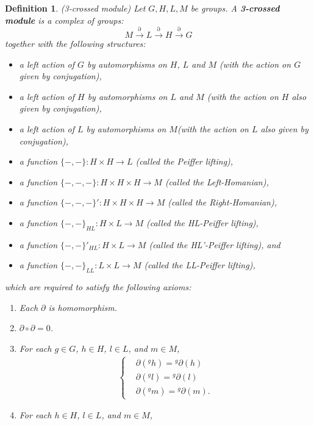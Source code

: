 \documentclass{tac}
\newtheorem{dfn}{Definition}
\begin{document}
\begin{dfn}{(3-crossed module)}
\label{d3cm}
Let $G,H,L,M$ be groups. A {\bf 3-crossed module} is a complex of groups:
\[
 M\xrightarrow{\partial}L \xrightarrow{\partial} H \xrightarrow{\partial} G 
\]
together with the following structures:
\begin{itemize}
  \item a left action of $G$ by automorphisms on  $H$, $L$ and $M$ (with the action on $G$ given by conjugation),
  \item a left action of $H$ by automorphisms on $L$ and $M$ (with the action on $H$ also given by conjugation),
  \item a left action of $L$ by automorphisms on $M$(with the action on $L$ also given by conjugation),
  \item a function $\{-,-\} : H \times H \rightarrow L$ (called the Peiffer lifting),
  \item a function $\{-,-,-\} : H \times H \times H  \rightarrow M$ (called the Left-Homanian),
  \item a function $\{-,-,-\}' : H \times H \times H  \rightarrow M$ (called the Right-Homanian),
  \item a function $\{-,-\}_{HL} : H \times L \rightarrow M$ (called the HL-Peiffer lifting),
  \item a function $\{-,-\}'_{HL} : H \times L \rightarrow M$ (called the HL'-Peiffer lifting),  and
  \item a function $\{-,-\}_{LL} : L \times L \rightarrow M$ (called the LL-Peiffer lifting),         
\end{itemize}
which are required to satisfy the following axioms:
\begin{enumerate}
  \item Each $\partial$ is homomorphism.
  \item  $\partial\circ \partial =0$.
  \item For each $g \in G$, $h \in H$, $l \in L$, and $m \in M$,
  \begin{align*}
\left\{
    \begin{aligned}
    & \partial({}^gh)= {{}^g}\partial(h) \\
    & \partial({}^gl)= {{}^g}\partial(l)  \\
    & \partial({}^gm)= {{}^g}\partial(m) .
    \end{aligned}
\right.
\end{align*}
  \item For each $h \in H$, $l \in L$, and $m \in M$,
  \begin{align*}

\end{align*}
\end{enumerate}
\end{dfn}
\end{document}
